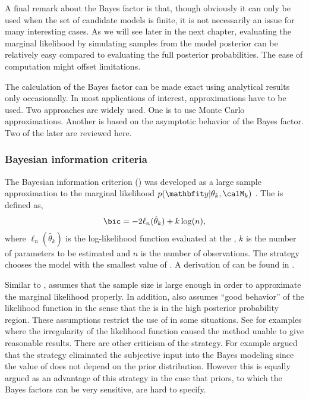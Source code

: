 

A final remark about the Bayes factor is that, though obviously it can only
be used when the set of candidate models is finite, it is not necessarily an
issue for many interesting cases. As we will see later in the next chapter,
evaluating the marginal likelihood by simulating samples from the model
posterior can be relatively easy compared to evaluating the full posterior
probabilities. The ease of computation might offset limitations.

The calculation of the Bayes factor can be made exact using analytical
results only occasionally. In most applications of interest, approximations
have to be used. Two approaches are widely used. One is to use Monte Carlo
approximations. Another is based on the asymptotic behavior of the Bayes
factor. Two of the later are reviewed here.

\subsubsection{Bayesian information criteria}
\label{ssub:Bayesian information criteria}

The Bayesian information criterion (\bic) was developed as a large sample
approximation to the marginal likelihood $p(\data|\theta_k,\calM_k)$
\cite{Schwarz:1978uv}. The \bic is defined as,
\begin{equation}
  \text{\bic} = -2\ell_n(\hat\theta_k) + k\log(n),
  \label{eq:bic}
\end{equation}
where $\ell_n(\hat\theta_k)$ is the log-likelihood function evaluated at the
\mle, $k$ is the number of parameters to be estimated and $n$ is the number
of observations. The \bic strategy chooses the model with the smallest value
of \bic. A derivation of \bic can be found in
\cite[][sec.~3.2]{Claeskens:2008tq}.

Similar to \aic, \bic assumes that the sample size is large enough in order
to approximate the marginal likelihood properly. In addition, \bic also
assumes ``good behavior'' of the likelihood function in the sense that the
\mle is in the high posterior probability region. These assumptions restrict
the use of \bic in some situations. See \cite{Berger:2001uy} for examples
where the irregularity of the likelihood function caused the \bic method
unable to give reasonable results. There are other criticism of the \bic
strategy. For example \cite[][sec.~7.2.3]{Robert:2007tc} argued that the \bic
strategy eliminated the subjective input into the Bayes modeling since the
value of \bic does not depend on the prior distribution. However this is
equally argued as an advantage of this strategy in the case that priors, to
which the Bayes factors can be very sensitive, are hard to specify.

